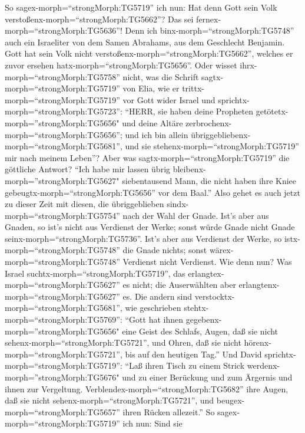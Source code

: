  So sagex-morph=``strongMorph:TG5719'' ich nun: Hat denn
Gott sein Volk verstoßenx-morph=``strongMorph:TG5662''? Das sei
fernex-morph=``strongMorph:TG5636''! Denn ich
binx-morph=``strongMorph:TG5748'' auch ein Israeliter von dem Samen
Abrahams, aus dem Geschlecht Benjamin.  Gott hat sein Volk
nicht verstoßenx-morph=``strongMorph:TG5662'', welches er zuvor ersehen
hatx-morph=``strongMorph:TG5656''. Oder wisset
ihrx-morph=``strongMorph:TG5758'' nicht, was die Schrift
sagtx-morph=``strongMorph:TG5719'' von Elia, wie er
trittx-morph=``strongMorph:TG5719'' vor Gott wider Israel und
sprichtx-morph=``strongMorph:TG5723'':  ``HERR, sie haben
deine Propheten getötetx-morph=''strongMorph:TG5656" und deine Altäre
zerbrochenx-morph=``strongMorph:TG5656''; und ich bin allein
übriggebliebenx-morph=``strongMorph:TG5681'', und sie
stehenx-morph=``strongMorph:TG5719'' mir nach meinem Leben''?
 Aber was sagtx-morph=``strongMorph:TG5719'' die göttliche
Antwort? ``Ich habe mir lassen übrig
bleibenx-morph=''strongMorph:TG5627" siebentausend Mann, die nicht haben
ihre Kniee gebeugtx-morph=``strongMorph:TG5656'' vor dem Baal.''
 Also gehet es auch jetzt zu dieser Zeit mit diesen, die
übriggeblieben sindx-morph=``strongMorph:TG5754'' nach der Wahl der
Gnade.  Ist's aber aus Gnaden, so ist's nicht aus Verdienst
der Werke; sonst würde Gnade nicht Gnade
seinx-morph=``strongMorph:TG5736''. Ist's aber aus Verdienst der Werke,
so istx-morph=``strongMorph:TG5748'' die Gnade nichts; sonst
wärex-morph=``strongMorph:TG5748'' Verdienst nicht Verdienst.
 Wie denn nun? Was Israel
suchtx-morph=``strongMorph:TG5719'', das
erlangtex-morph=``strongMorph:TG5627'' es nicht; die Auserwählten aber
erlangtenx-morph=``strongMorph:TG5627'' es. Die andern sind
verstocktx-morph=``strongMorph:TG5681'',  wie geschrieben
stehtx-morph=``strongMorph:TG5769'': ``Gott hat ihnen
gegebenx-morph=''strongMorph:TG5656" eine Geist des Schlafs, Augen, daß
sie nicht sehenx-morph=``strongMorph:TG5721'', und Ohren, daß sie nicht
hörenx-morph=``strongMorph:TG5721'', bis auf den heutigen Tag.''
 Und David sprichtx-morph=``strongMorph:TG5719'': ``Laß
ihren Tisch zu einem Strick werdenx-morph=''strongMorph:TG5676" und zu
einer Berückung und zum Ärgernis und ihnen zur Vergeltung. 
Verblendex-morph=``strongMorph:TG5682'' ihre Augen, daß sie nicht
sehenx-morph=``strongMorph:TG5721'', und
beugex-morph=``strongMorph:TG5657'' ihren Rücken allezeit.''
 So sagex-morph=``strongMorph:TG5719'' ich nun: Sind sie
